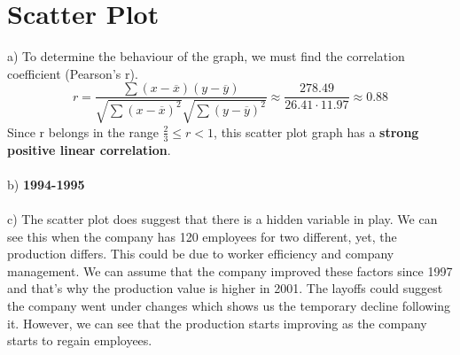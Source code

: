 \documentclass{article}
\begin{document}
\section{Scatter Plot}
\begin{center}
\end{center}
a) 
To determine the behaviour of the graph, we must find the correlation coefficient (Pearson's r).
\[r = \frac{\sum (x - \overline x)(y - \overline y)}{\sqrt{\sum (x-\overline x)^2}\sqrt{\sum (y-\overline y)^2}} \approx \frac{278.49}{26.41\cdot11.97} \approx 0.88\]
Since r belongs in the range \(\frac{2}{3} \leq r < 1\), this scatter plot graph has a \textbf{strong positive linear correlation}.
\\\\
b) \textbf{1994-1995}
\\\\
c) The scatter plot does suggest that there is a hidden variable in play. We can see this when the company has 120 employees for two different, yet, the production differs. This could be due to worker efficiency and company management. We can assume that the company improved these factors since 1997 and that's why the production value is higher in 2001. The layoffs could suggest the company went under changes which shows us the temporary decline following it. However, we can see that the production starts improving as the company starts to regain employees.
\\\\
\end{document}
